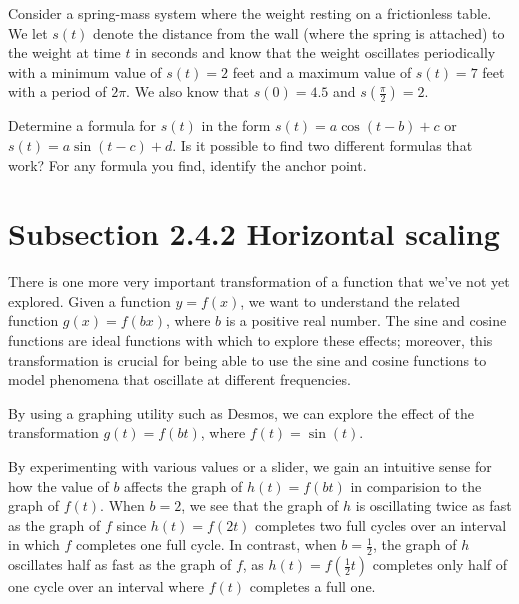 \documentclass{ximera}
\begin{document}
\begin{exploration}
Consider a spring-mass system where the weight resting on a frictionless table.  We let \(s(t)\) denote the distance from the wall (where the spring is attached) to the weight at time \(t\) in seconds and know that the weight oscillates periodically with a minimum value of \(s(t) = 2\) feet and a maximum value of \(s(t) = 7\) feet with a period of \(2 \pi\).  We also know that \(s(0) = 4.5\) and \(s\left(\frac{\pi}{2}\right) = 2\).%

Determine a formula for \(s(t)\) in the form \(s(t) = a\cos(t-b)+c\) or \(s(t) = a\sin(t-c)+d\).  Is it possible to find two different formulas that work?  For any formula you find, identify the anchor point.%
\end{exploration}
%
%
%

\section{Subsection 2.4.2 Horizontal scaling}

There is one more very important transformation of a function that we've not yet explored.  Given a function \(y = f(x)\), we want to understand the related function \(g(x) = f(bx)\), where \(b\) is a positive real number.  The sine and cosine functions are ideal functions with which to explore these effects; moreover, this transformation is crucial for being able to use the sine and cosine functions to model phenomena that oscillate at different frequencies.%

By using a graphing utility such as Desmos, we can explore the effect of the transformation \(g(t) = f(bt)\), where \(f(t) = \sin(t)\).%

By experimenting with various values or a slider, we gain an intuitive sense for how the value of \(b\) affects the graph of \(h(t) = f(bt)\) in comparision to the graph of \(f(t)\).  When \(b = 2\), we see that the graph of \(h\) is oscillating twice as fast as the graph of \(f\) since \(h(t) = f(2t)\) completes two full cycles over an interval in which \(f\) completes one full cycle.  In contrast, when \(b = \frac{1}{2}\), the graph of \(h\) oscillates half as fast as the graph of \(f\), as \(h(t) = f(\frac{1}{2}t)\) completes only half of one cycle over an interval where \(f(t)\) completes a full one.%
\end{document}
